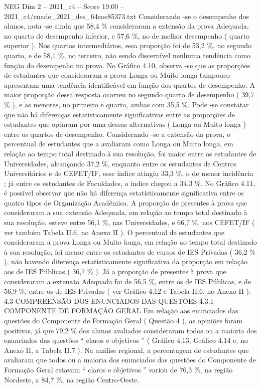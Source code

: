 \begin{textsample}{NEG Dim 2 – 2021\_c4 – Score 19.00 – 2021\_c4/enade\_2021\_des\_64eae85373.txt}
Considerando -se o desempenho dos alunos, nota -se ainda que 58,4 \% consideraram a extensão da prova Adequada, no quarto de desempenho inferior, e 57,6 \%, no de melhor desempenho ( quarto superior ).
Nos quartos intermediários, essa proporção foi de 53,2 \%, no segundo quarto, e de 58,1 \%, no terceiro, não sendo discernível nenhuma tendência como função do desempenho na prova.
No Gráfico 4.10, observa -se que as proporções de estudantes que consideraram a prova Longa ou Muito longa tampouco apresentam uma tendência identificável em função dos quartos de desempenho.
A maior proporção dessa resposta ocorreu no segundo quarto de desempenho ( 39,7 \% ), e as menores, no primeiro e quarto, ambas com 35,5 \%.
Pode -se constatar que não há diferenças estatisticamente significativas entre as proporções de estudantes que optaram por uma dessas alternativas ( Longa ou Muito longa ) entre os quartos de desempenho.
Considerando -se a extensão da prova, o percentual de estudantes que a avaliaram como Longa ou Muito longa, em relação ao tempo total destinado à sua resolução, foi maior entre os estudantes de Universidades, alcançando 37,2 \%, enquanto entre os estudantes de Centros Universitários e de CEFET/IF, esse índice atingiu 33,3 \%, o de menor incidência ; já entre os estudantes de Faculdades, o índice chegou a 34,3 \%.
No Gráfico 4.11, é possível observar que não há diferença estatisticamente significativa entre os quatro tipos de Organização Acadêmica.
A proporção de presentes à prova que consideraram a sua extensão Adequada, em relação ao tempo total destinado à sua resolução, esteve entre 56,1 \%, nas Universidades, e 66,7 \%, nos CEFET/IF ( ver também Tabela II.6, no Anexo II ).
O percentual de estudantes que consideraram a prova Longa ou Muito longa, em relação ao tempo total destinado à sua resolução, foi menor entre os estudantes de cursos de IES Privadas ( 36,2 \% ), não havendo diferença estatisticamente significativa da proporção em relação aos de IES Públicas ( 36,7 \% ).
Já a proporção de presentes à prova que consideraram a extensão Adequada foi de 56,5 \%, entre os de IES Públicas, e de 56,9 \%, entre os de IES Privadas ( ver Gráfico 4.12 e Tabela II.6, no Anexo II ). 4.3 COMPREENSÃO DOS ENUNCIADOS DAS QUESTÕES 4.3.1 COMPONENTE DE FORMAÇÃO GERAL Em relação aos enunciados das questões do Componente de Formação Geral ( Questão 4 ), as opiniões foram positivas, já que 79,2 \% dos alunos avaliados consideraram todos ou a maioria dos enunciados das questões “ claros e objetivos ” ( Gráfico 4.13, Gráfico 4.14 e, no Anexo II, a Tabela II.7 ).
Na análise regional, a percentagem de estudantes que avaliaram que todos ou a maioria dos enunciados das questões do Componente de Formação Geral estavam “ claros e objetivos ” variou de 76,3 \%, na região Nordeste, a 84,7 \%, na região Centro-Oeste.

\end{textsample}
